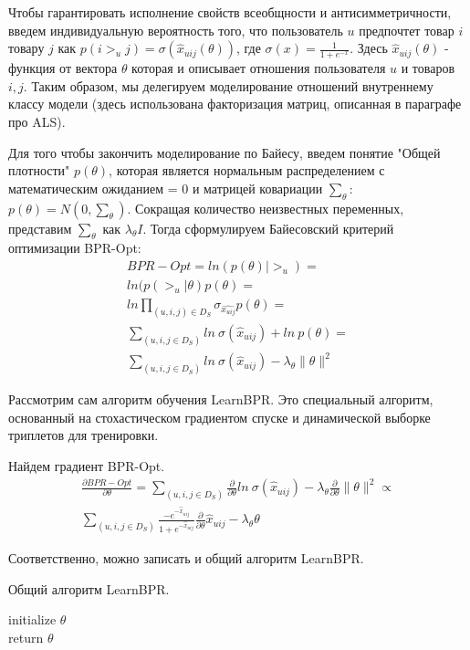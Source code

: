 \documentclass[14pt]{mmcs_article}
\begin{document}
Чтобы гарантировать исполнение свойств всеобщности и антисимметричности, введем индивидуальную вероятность того, что пользователь $ u $ предпочтет товар $ i $ товару $ j $ как $p(i >_u j) = \sigma(\hat{x}_{uij}(\theta))$, где $\sigma(x) = \frac{1}{1+e^{-x}}$. Здесь $ \hat{x}_{uij}(\theta) $ - функция от вектора $\theta$ которая и описывает отношения пользователя $u$ и товаров $ i,j $. Таким образом, мы делегируем моделирование отношений внутреннему классу модели (здесь использована факторизация матриц, описанная в параграфе про ALS).  

Для того чтобы закончить моделирование по Байесу, введем понятие "Общей плотности" $ p(\theta) $, которая является нормальным распределением с математическим ожиданием = 0 и матрицей ковариации $ \sum_{\theta} $: $p(\theta) = N(0,\sum_{\theta})$.
Сокращая количество неизвестных переменных, представим $ \sum_{\theta} $ как $ \lambda_{\theta} I $. Тогда сформулируем Байесовский критерий оптимизации BPR-Opt:
\begin{equation}
	\begin{split}
		BPR-Opt = ln(p(\theta) |  >_u) = \\
		ln(p(>_u | \theta)p(\theta)	= \\
		ln \prod_{(u,i,j) \in D_S} \sigma_{\hat{x_{uij}}}p(\theta) = \\ 
		\sum_{(u,i,j \in D_S)}ln \ \sigma(\hat{x}_{uij}) + ln \  p(\theta) = \\
		\sum_{(u,i,j \in D_S)}ln \ \sigma(\hat{x}_{uij}) - \lambda_{\theta} \parallel \theta \parallel ^ 2
	\end{split}
\end{equation}

Рассмотрим сам алгоритм обучения LearnBPR. Это специальный алгоритм, основанный на стохастическом градиентом спуске и динамической выборке триплетов для тренировки.

Найдем градиент BPR-Opt.
\begin{multline}
	\frac{\partial BPR-Opt}{\partial \theta} = \sum_{(u,i,j \in D_S)} \frac{\partial}{\partial \theta} ln \ \sigma(\hat{x}_{uij}) - \lambda_{\theta} \frac{\partial}{\partial \theta} \parallel \theta \parallel ^ 2 \propto \\
	 \sum_{(u,i,j \in D_S)} \frac{- e^{-\hat{x}_{uij}}}{1 + e^{-\hat{x}_{uij}}} \frac{\partial}{\partial \theta} \hat{x}_{uij} - \lambda_{\theta} \theta
\end{multline}

Соответственно, можно записать и общий алгоритм LearnBPR.\\
\begin{algorithm}[H]\label{bpr:1}
	\caption{Общий алгоритм LearnBPR.}
	\KwOut{$\theta$}
	initialize $\theta$ \\
	return $\theta$
\end{algorithm}
\end{document}
